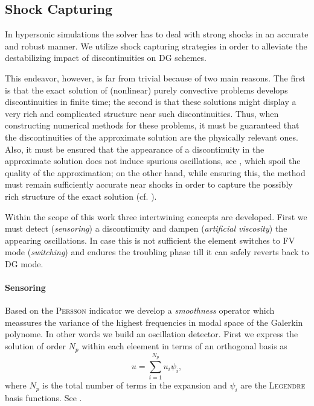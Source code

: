 \subsection{Shock Capturing}
\label{sec:shock-capturing}

In hypersonic simulations the solver has to deal with strong shocks in an
accurate and robust manner. We utilize shock capturing strategies in order to
alleviate the destabilizing impact of discontinuities on DG schemes.

This endeavor, however, is far from trivial because of two main reasons.  The
first is that the exact solution of (nonlinear) purely convective problems
develops discontinuities in finite time; the second is that these solutions
might display a very rich and complicated structure near such discontinuities.
Thus, when constructing numerical methods for these problems, it must be
guaranteed that the discontinuities of the approximate solution are the
physically relevant ones. Also, it must be ensured that the appearance of a
discontinuity in the approximate solution does not induce spurious
oscillations, see , which spoil the quality of
the approximation; on the other hand, while ensuring this, the method must
remain sufficiently accurate near shocks in order to capture the possibly rich
structure of the exact solution (cf.  ).

Within the scope of this work three intertwining concepts are developed.  First
we must detect (\emph{sensoring}) a discontinuity and dampen (\emph{artificial
viscosity}) the appearing oscillations. In case this is not sufficient the
element switches to FV mode (\emph{switching}) and endures the troubling
phase till it can safely reverts back to DG mode.

\paragraph{Sensoring}
Based on the \textsc{Persson} indicator we develop a \emph{smoothness} operator
which meassures the variance of the highest frequencies in modal space of the
Galerkin polynome. In other words we build an oscillation detector.  First we
express the solution of order $N_p$ within each eleement in terms of an
orthogonal basis as
\begin{equation}
    u = \sum^{N_p}_{i=1} u_i \psi_i,
\end{equation}
where $N_p$ is the total number of terms in the expansion and $\psi_i$ are the
\textsc{Legendre} basis functions. See .

